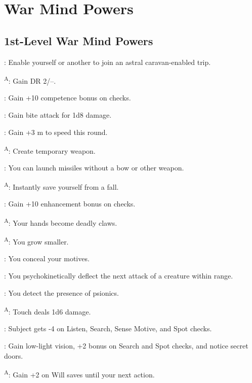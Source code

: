 \section{War Mind Powers}




\subsection{1st-Level War Mind Powers}

: Enable yourself or another to join an astral caravan-enabled trip.

\textsuperscript{A}: Gain DR 2/--.

: Gain +10 competence bonus on  checks. %

: Gain bite attack for 1d8 damage.

: Gain +3 m to speed this round.

\textsuperscript{A}: Create temporary weapon.

: You can launch missiles without a bow or other weapon. %

\textsuperscript{A}: Instantly save yourself from a fall.

: Gain +10 enhancement bonus on  checks.

\textsuperscript{A}: Your hands become deadly claws.

\textsuperscript{A}: You grow smaller.

: You conceal your motives.

: You psychokinetically deflect the next attack of a creature within range. %

: You detect the presence of psionics.

\textsuperscript{A}: Touch deals 1d6 damage.

: Subject gets -4 on Listen, Search, Sense Motive, and Spot checks.

: Gain low-light vision, +2 bonus on Search and Spot checks, and notice secret doors.

\textsuperscript{A}: Gain +2 on Will saves until your next action.

